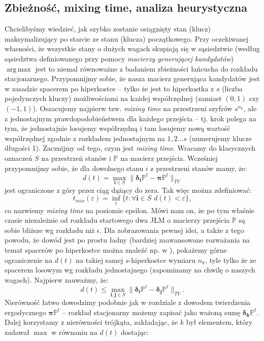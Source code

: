 \documentclass[a4paper]{article}
\DeclareMathOperator*{\argmax}{arg\,max}
\theoremstyle{defn}
\theoremstyle{theorem}
\theoremstyle{lemma}
\theoremstyle{cor}
\theoremstyle{fact}
\begin{document}
\subsection{Zbieżność, mixing time, analiza heurystyczna}
Chcielibyśmy wiedzieć, jak szybko zostanie osiągnięty stan (klucz) maksymalizujący po starcie ze stanu (klucza) początkowego. Przy oczekiwanej własności, że wszystkie stany o dużych wagach skupiają się w sąsiedztwie (według sąsiedztwa definiowanego przy pomocy \textit{macierzy generującej kandydatów}) $\argmax$ jest to niemal równoważne z badaniem zbieżności łańcucha do rozkładu stacjonarnego. Przypomnijmy sobie, że nasza macierz generująca kandydatów jest w zasadzie spacerem po hiperkostce – tylko że jest to hiperkostka z $s$ (liczba pojedynczych kluczy) możliwościami na każdej współrzędnej (zamiast $(0,1)$ czy $(-1,1)$). Oszacujemy najpierw tzw. \textit{mixing time} na przestrzeni szyfrów $s^{n_k}$, ale z jednostajnym prawdopodobieństwem dla każdego przejścia – tj. krok polega na tym, że jednostajnie losujemy współrzędną i tam losujemy nową wartość współrzędnej zgodnie z rozkładem jednostajnym na $1,2...s$ (numerujemy klucze długości 1). Zacznijmy od tego, czym jest \textit{mixing time}. Wracamy do klasycznych oznaczeń $S$ na przestrzeń stanów i $\mathbb{P}$ na macierz przejścia. Wcześniej przypomnijmy sobie, że dla dowolnego stanu $i$ z przestrzeni stanów mamy, że:
$$d(t) = \max_{\boldsymbol{i} \in S} \|\boldsymbol{\delta_i} \mathbb{P}^t - \boldsymbol{\pi} \mathbb{P}^t\|_{TV}$$
jest ograniczone z góry przez ciąg dążący do zera. Tak więc można zdefiniować:
$$ t_{mix}(\varepsilon) = \inf_t \{t: \forall \boldsymbol{i} \in S\,\, d(t) < \varepsilon\},$$
co nazwiemy \textit{mixing time} na poziomie epsilon. Mówi nam on, że po tym właśnie czasie niezależnie od rozkładu startowego dwa JŁM o macierzy przejścia $\mathbb{P}$ są sobie bliższe wg rozkładu niż $\epsilon$. Dla zobrazowania pewnej idei, a także z tego powodu, że dowód jest po prostu ładny (bardziej zaawansowane rozważania na temat spacerów po hiperkostce można znaleźć np. w \cite{mixing}), pokażemy górne ograniczenie na $d(t)$ na takiej samej $s$-hiperkostce wymiaru $n_k$, tyle tylko że ze spacerem losowym wg rozkładu jednostajnego (zapominamy na chwilę o naszych wagach). Najpierw zauważmy, że:
$$d(t) \leq \max_{\boldsymbol{i},\boldsymbol{j} \in S} \|\boldsymbol{\delta_i} \mathbb{P}^t - \boldsymbol{\delta_j} \mathbb{P}^t \|_{TV}.$$
Nierówność łatwo dowodzimy podobnie jak w rozdziale z dowodem twierdzenia ergodycznego $\boldsymbol{\pi}\mathbb{P}^t$ – rozkład stacjonarny możemy zapisać jako ważoną sumę $\boldsymbol{\delta_k} \mathbb{P}^t$. Dalej korzystamy z nierówności trójkąta, zakładając, że $k$ był elementem, który zadawał $\max$ w równaniu na $d(t)$ dostając:
\end{document}
